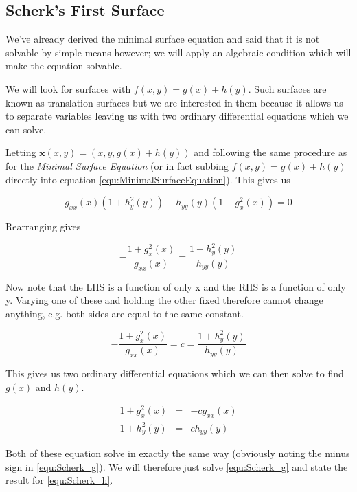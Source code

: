 \subsection{Scherk's First Surface}
We've already derived the minimal surface equation and said that it is not solvable by simple means however; we will apply an algebraic condition which will make the equation solvable.

We will look for surfaces with $f(x,y) = g(x) + h(y)$. Such surfaces are known as translation surfaces but we are interested in them because it allows us to separate variables leaving us with two ordinary differential equations which we can solve.

Letting $\mathbf x(x,y) = (x, y, g(x) + h(y))$ and following the same procedure as for the \emph{Minimal Surface Equation} (or in fact subbing $f(x,y) = g(x) + h(y)$ directly into equation \ref{equ:MinimalSurfaceEquation}). This gives us

\begin{equation}
g_{xx}(x)(1+h_y^2(y))+h_{yy}(y)(1+g_x^2(x)) = 0 
\label{equ:ScherkMinSurf}
\end{equation}

Rearranging gives

\begin{displaymath}
-\frac{1+g_x^2(x)}{g_{xx}(x)} = \frac{1+h_y^2(y)}{h_{yy}(y)}
\end{displaymath}

Now note that the LHS is a function of only x and the RHS is a function of only y. Varying one of these and holding the other fixed therefore cannot change anything, e.g. both sides are equal to the same constant.

\begin{displaymath}
-\frac{1+g_x^2(x)}{g_{xx}(x)} = c = \frac{1+h_y^2(y)}{h_{yy}(y)}
\end{displaymath}

This gives us two ordinary differential equations which we can then solve to find $g(x)$ and $h(y)$.

\begin{eqnarray}
\label{equ:Scherk_g}
1+g_x^2(x) &=& - cg_{xx}(x) \\
\label{equ:Scherk_h}
1+h_y^2(y) &=& ch_{yy}(y)
\end{eqnarray}

Both of these equation solve in exactly the same way (obviously noting the minus sign in \ref{equ:Scherk_g}). We will therefore just solve \ref{equ:Scherk_g} and state the result for \ref{equ:Scherk_h}.

